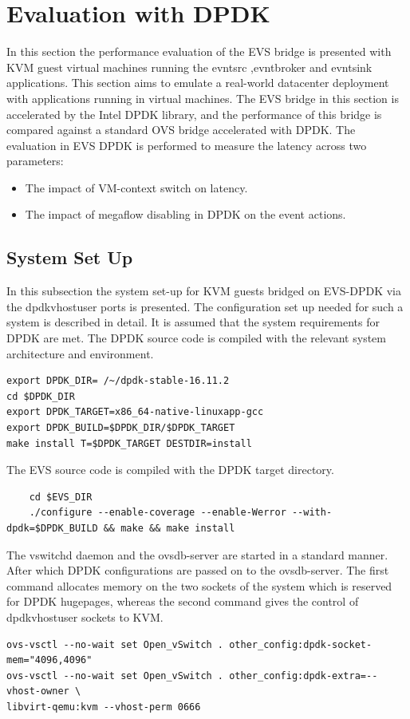\section{Evaluation with DPDK}
In this section the performance evaluation of the EVS bridge is presented with KVM guest virtual machines running the evntsrc ,evntbroker and evntsink applications. This section aims to emulate a real-world datacenter deployment with applications running in virtual machines. The EVS bridge in this section is accelerated by the Intel DPDK library, and the performance of this bridge is compared against a standard OVS bridge accelerated with DPDK. The evaluation in EVS DPDK is performed to measure the latency across two parameters:
\begin{itemize}
	\item The impact of VM-context switch on latency. 
	\item The impact of megaflow disabling in DPDK on the event actions.
\end{itemize}


\subsection{System Set Up}
In this subsection the system set-up for KVM guests bridged on EVS-DPDK via the dpdkvhostuser ports is presented. The configuration set up needed for such a system is described in detail. It is assumed that the system requirements for DPDK are met.\newline
The DPDK source code is compiled with the relevant system architecture and environment. 

\begin{lstlisting}
export DPDK_DIR= /~/dpdk-stable-16.11.2
cd $DPDK_DIR
export DPDK_TARGET=x86_64-native-linuxapp-gcc
export DPDK_BUILD=$DPDK_DIR/$DPDK_TARGET
make install T=$DPDK_TARGET DESTDIR=install
\end{lstlisting}

The EVS source code is compiled with the DPDK target directory.
	\begin{lstlisting}
	cd $EVS_DIR
	./configure --enable-coverage --enable-Werror --with-dpdk=$DPDK_BUILD && make && make install
	\end{lstlisting}

The vswitchd daemon and the ovsdb-server are started in a standard manner. After which DPDK configurations are passed on to the ovsdb-server. The first command allocates memory on the two sockets of the system which is reserved for DPDK hugepages, whereas the second command gives the control of dpdkvhostuser sockets to KVM.
\begin{lstlisting}
ovs-vsctl --no-wait set Open_vSwitch . other_config:dpdk-socket-mem="4096,4096"
ovs-vsctl --no-wait set Open_vSwitch . other_config:dpdk-extra=--vhost-owner \
libvirt-qemu:kvm --vhost-perm 0666
\end{lstlisting}

